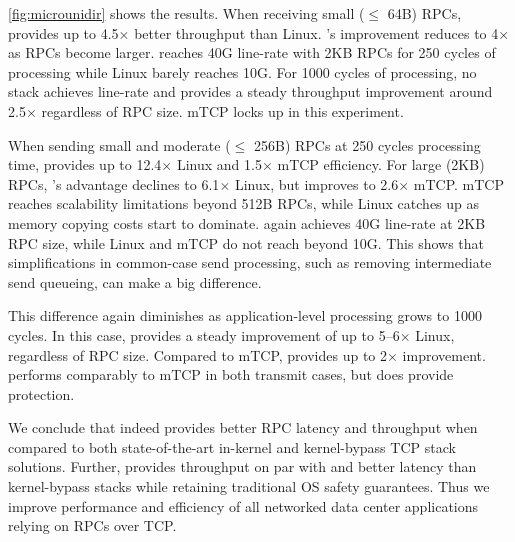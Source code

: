 \autoref{fig:microunidir} shows the results. When receiving small
($\leq$ 64B) RPCs, \rmttcp provides up to 4.5$\times$ better
throughput than Linux. \rmttcp's improvement reduces to 4$\times$ as
RPCs become larger. \rmttcp reaches 40G line-rate with 2KB RPCs for
250 cycles of processing while Linux barely reaches 10G. For 1000
cycles of processing, no stack achieves line-rate and \rmttcp provides
a steady throughput improvement around 2.5$\times$ regardless of RPC
size. %
mTCP locks up in this experiment.

When sending small and moderate ($\leq$ 256B) RPCs at 250 cycles
processing time, \rmttcp provides up to 12.4$\times$ Linux and
1.5$\times$ mTCP efficiency. For large (2KB) RPCs, \rmttcp's advantage
declines to 6.1$\times$ Linux, but improves to 2.6$\times$ mTCP. mTCP
reaches scalability limitations beyond 512B RPCs, while Linux catches
up as memory copying costs start to dominate. \rmttcp again achieves
40G line-rate at 2KB RPC size, while Linux and mTCP do not reach
beyond 10G. This shows that simplifications in common-case send
processing, such as removing intermediate send queueing, can make a big
difference.

This difference again diminishes as application-level processing grows
to 1000 cycles. In this case, \rmttcp provides a steady improvement of
up to 5--6$\times$ Linux, regardless of RPC size. Compared to mTCP, \rmttcp
provides up to 2$\times$ improvement. \softtcp performs comparably to
mTCP in both transmit cases, but does provide protection.

\vspace{1ex}
\noindent We conclude that \rmttcp indeed provides better RPC latency
and throughput when compared to both state-of-the-art in-kernel and
kernel-bypass TCP stack solutions.
Further, \softtcp provides throughput on par with and better latency than
kernel-bypass stacks while retaining traditional OS safety guarantees.
Thus we improve performance and efficiency of all networked data center
applications relying on RPCs over TCP.

